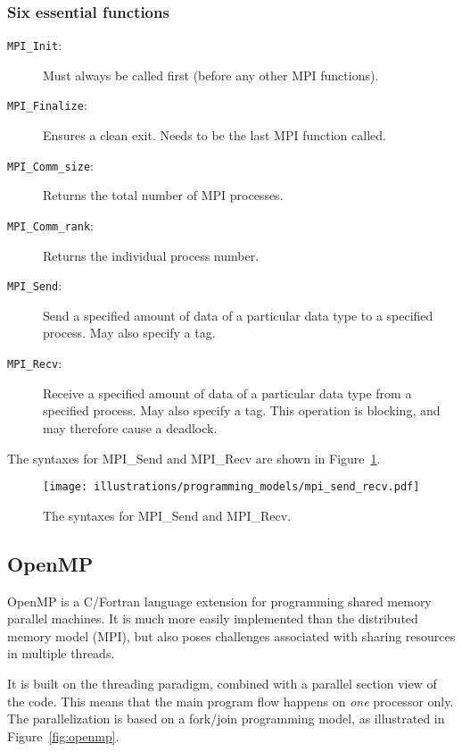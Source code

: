 \subsubsection{Six essential functions} %
\label{ssub:six_essential_functions}
\begin{description}
  \item[\texttt{MPI\_Init}:] Must always be called first (before any other MPI functions).
  \item[\texttt{MPI\_Finalize}:] Ensures a clean exit. Needs to be the last MPI function called.
  \item[\texttt{MPI\_Comm\_size}:] Returns the total number of MPI processes.
  \item[\texttt{MPI\_Comm\_rank}:] Returns the individual process number.
  \item[\texttt{MPI\_Send}:] Send a specified amount of data of a particular data type to a specified process. May also specify a tag.
  \item[\texttt{MPI\_Recv}:] Receive a specified amount of data of a particular data type from a specified process. May also specify a tag. This operation is blocking, and may therefore cause a deadlock.
\end{description}
The syntaxes for MPI\_Send and MPI\_Recv are shown in Figure~\ref{fig:mpi_send_recv}.

\begin{figure}[htbp]
  \centering
  \texttt{[image: illustrations/programming\_models/mpi\_send\_recv.pdf]}
  \caption{The syntaxes for MPI\_Send and MPI\_Recv.}
  \label{fig:mpi_send_recv}
\end{figure}









\subsection{OpenMP} %
\label{sub:openmp}
OpenMP is a C/Fortran language extension for programming shared memory parallel machines. It is much more easily implemented than the distributed memory model (MPI), but also poses challenges associated with sharing resources in multiple threads.

It is built on the threading paradigm, combined with a parallel section view of the code. This means that the main program flow happens on \emph{one} processor only. The parallelization is based on a fork/join programming model, as illustrated in Figure~\ref{fig:openmp}.


